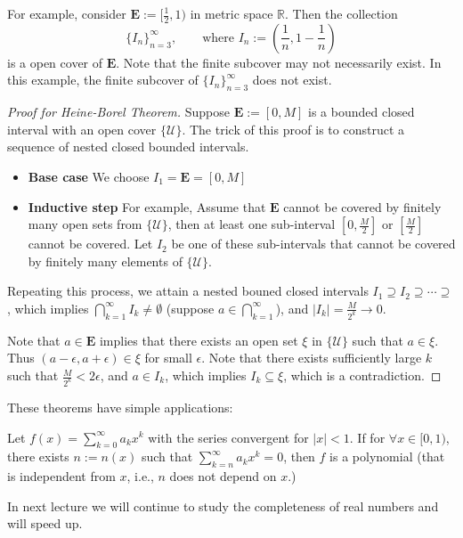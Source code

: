 For example, consider $\bm E:=[\frac{1}{2},1)$ in metric space $\mathbb{R}$. Then the collection
\[
\{I_n\}_{n=3}^\infty,\qquad
\mbox{where }I_n:=(\frac{1}{n},1-\frac{1}{n})
\]
is a open cover of $\bm E$. Note that the finite subcover may not necessarily exist. In this example, the finite subcover of $\{I_n\}_{n=3}^\infty$ does not exist.
\begin{proof}[Proof for Heine-Borel Theorem]\quad

Suppose $\bm E:=[0,M]$ is a bounded closed interval with an open cover $\{\mathcal{U}\}.$ The trick of this proof is to construct a sequence of nested closed bounded intervals. 
\begin{itemize}
\item\textbf{Base case }
We choose $I_1 =\bm E=[0,M]$
\item\textbf{Inductive step}
For example, Assume that $\bm E$ cannot be covered by finitely many open sets from $\{\mathcal{U}\}$, then at least one sub-interval $[0,\frac{M}{2}]$ or $[\frac{M}{2}]$ cannot be covered. Let $I_2$ be one of these sub-intervals that cannot be covered by finitely many elements of $\{\mathcal{U}\}$.
\end{itemize}

Repeating this process, we attain a nested bouned closed intervals $I_1\supseteq I_2\supseteq\cdots\supseteq$, which implies $\bigcap_{k=1}^\infty I_k \ne\emptyset$ (suppose $a\in \bigcap_{k=1}^\infty$), and $|I_k|=\frac{M}{2^k}\to0$.

Note that $a\in\bm E$ implies that there exists an open set $\xi$ in $\{\mathcal{U}\}$ such that $a\in\xi$. Thus $(a-\epsilon,a+\epsilon)\in\xi$ for small $\epsilon$. Note that there exists sufficiently large $k$ such that $\frac{M}{2^k}<2\epsilon$, and $a\in I_k$, which implies $I_k\subseteq\xi$, which is a contradiction.
\end{proof}




These theorems have simple applications:
\begin{proposition}
Let $f(x) = \sum_{k=0}^\infty a_kx^k$ with the series convergent for $|x|<1$. If for $\forall x\in[0,1)$, there exists $n:=n(x)$ such that $\sum_{k=n}^\infty a_kx^k=0$, then $f$ is a polynomial (that is independent from $x$, i.e., $n$ does not depend on $x$.)
\end{proposition}
In next lecture we will continue to study the completeness of real numbers and will speed up.






















